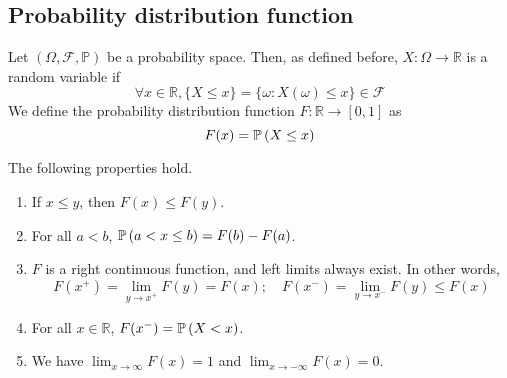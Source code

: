 \subsection{Probability distribution function}
Let \((\Omega, \mathcal F, \mathbb P)\) be a probability space.
Then, as defined before, \(X \colon \Omega \to \mathbb R\) is a random variable if
\[
	\forall x \in \mathbb R, \{ X \leq x \} = \{ \omega \colon X(\omega) \leq x \} \in \mathcal F
\]
We define the probability distribution function \(F \colon \mathbb R \to [0, 1]\) as
\[
	F(x) = \mathbb{P}\left({X \leq x}\right)
\]
\begin{theorem}
	The following properties hold.
	\begin{enumerate}
		\item If \(x \leq y\), then \(F(x) \leq F(y)\).
		\item For all \(a < b\), \(\mathbb{P}\left({a < x \leq b}\right) = F(b) - F(a)\).
		\item \(F\) is a right continuous function, and left limits always exist.
		      In other words,
		      \[
			      F(x^+) = \lim_{y \to x^+} F(y) = F(x);\quad F(x^-) = \lim_{y \to x^-} F(y) \leq F(x)
		      \]
		\item For all \(x \in\mathbb R\), \(F(x^-) = \mathbb{P}\left({X < x}\right)\).
		\item We have \(\lim_{x \to \infty} F(x) = 1\) and \(\lim_{x \to -\infty} F(x) = 0\).
	\end{enumerate}
\end{theorem}
